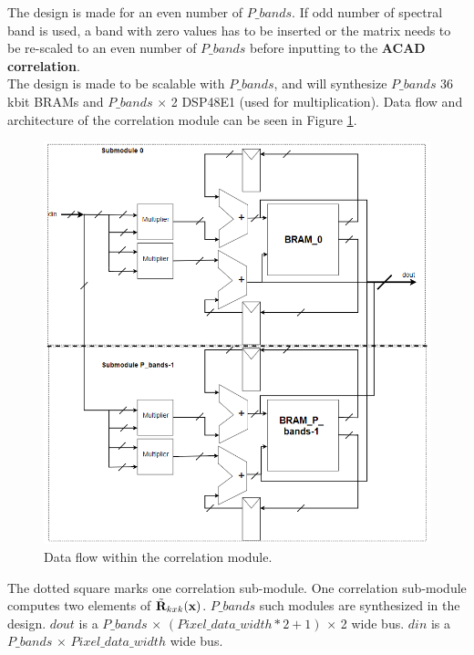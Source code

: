 
The design is made for an even number of $P\_bands$. If odd number of spectral band is used, a band with zero values has to be inserted or the matrix needs to be re-scaled to an even number of $P\_bands$ before inputting to the \textbf{ACAD correlation}.\\

The design is made to be scalable with $P\_bands$, and will synthesize $P\_bands$ 36 kbit BRAMs and $P\_bands$ $\times$ 2 DSP48E1 (used for multiplication). Data flow and architecture of the correlation module can be seen in Figure \ref{fig:data_flow_correlation}. 


\begin{figure}[H]
\centering
   \includegraphics[scale=0.4]{images/correlation_data_path.PNG}
  \caption{Data flow within the correlation module.  } 
  \label{fig:data_flow_correlation}
\end{figure}

The dotted square marks one correlation sub-module. One correlation sub-module computes two elements of  $\Tilde{\textbf{R}}_{k x k}(\textbf{x})$.  $P\_bands$ such modules are synthesized in the design. $dout$ is a $P\_bands$ $\times$
$(Pixel\_data\_width*2+1)$ $\times$ 2 wide bus. $din$ is a $P\_bands$ $\times$
$Pixel\_data\_width$ wide bus.






